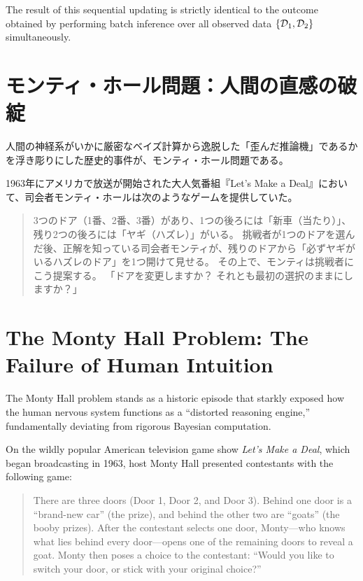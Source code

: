     The result of this sequential updating is strictly identical to the outcome obtained by performing batch inference over all observed data $\{\mathcal{D}_1, \mathcal{D}_2\}$ simultaneously.

    

\fi

\ifja
    \section{モンティ・ホール問題：人間の直感の破綻}
    人間の神経系がいかに厳密なベイズ計算から逸脱した「歪んだ推論機」であるかを浮き彫りにした歴史的事件が、モンティ・ホール問題である。

    1963年にアメリカで放送が開始された大人気番組『Let's Make a Deal』において、司会者モンティ・ホールは次のようなゲームを提供していた。
    \begin{quote}
        3つのドア（1番、2番、3番）があり、1つの後ろには「新車（当たり）」、残り2つの後ろには「ヤギ（ハズレ）」がいる。
        挑戦者が1つのドアを選んだ後、正解を知っている司会者モンティが、残りのドアから「必ずヤギがいるハズレのドア」を1つ開けて見せる。
        その上で、モンティは挑戦者にこう提案する。
        「ドアを変更しますか？ それとも最初の選択のままにしますか？」
    \end{quote}
\else
    \section{The Monty Hall Problem: The Failure of Human Intuition}
    The Monty Hall problem stands as a historic episode that starkly exposed how the human nervous system functions as a ``distorted reasoning engine,'' fundamentally deviating from rigorous Bayesian computation.

    On the wildly popular American television game show \textit{Let's Make a Deal}, which began broadcasting in 1963, host Monty Hall presented contestants with the following game:
    \begin{quote}
        There are three doors (Door 1, Door 2, and Door 3). Behind one door is a ``brand-new car'' (the prize), and behind the other two are ``goats'' (the booby prizes).
        After the contestant selects one door, Monty—who knows what lies behind every door—opens one of the remaining doors to reveal a goat.
        Monty then poses a choice to the contestant:
        ``Would you like to switch your door, or stick with your original choice?''
    \end{quote}
\fi

